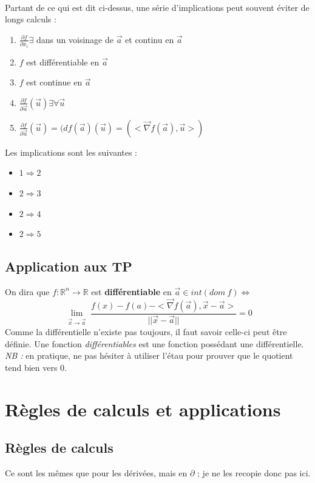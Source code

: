 \documentclass	[11pt, a4paper, openany]{book}
\begin{document}
\ \\

Partant de ce qui est dit ci-dessus, une série d'implications peut souvent éviter de longs calculs : 
\begin{enumerate}
\item $\frac{\partial f}{\partial x_i} \exists$ dans un voisinage de $\vec{a}$ et continu en $\vec{a}$
\item $f$ est différentiable en $\vec{a}$
\item $f$ est continue en $\vec{a}$
\item $\frac{\partial f}{\partial \vec{a}}(\vec{u}) \exists \forall \vec{u}$
\item $\frac{\partial f}{\partial \vec{a}}(\vec{u}) = (df(\vec{a})(\vec{u}) = (<\vec{\nabla}f(\vec{a}), \vec{u}>)$
\end{enumerate}
Les implications sont les suivantes : 
\begin{itemize}
\item $1 \Rightarrow 2$
\item $2 \Rightarrow 3$
\item $2 \Rightarrow 4$
\item $2 \Rightarrow 5$
\end{itemize}

\subsection*{Application aux TP}
On dira que $f : \mathbb{R}^n \rightarrow \mathbb{R}$ est \textbf{différentiable} en $\vec{a} \in int(dom\ f) \Leftrightarrow$
$$\lim\limits_{\substack{\vec{x} \to \vec{a}}} \frac{f(x) - f(a) - <\vec{\nabla}f(\vec{a}), \vec{x} - \vec{a}>}{||\vec{x} - \vec{a}||} = 0$$
Comme la différentielle n'existe pas toujours, il faut savoir celle-ci peut être définie. Une fonction \textit{différentiables} est une fonction possédant une différentielle.\\

\textit{NB :} en pratique, ne pas hésiter à utiliser l'étau pour prouver que le quotient tend bien vers 0.


\section{Règles de calculs et applications}
\subsection{Règles de calculs}
Ce sont les mêmes que pour les dérivées, mais en $\partial$ ; je ne les recopie donc pas ici.
\end{document}
